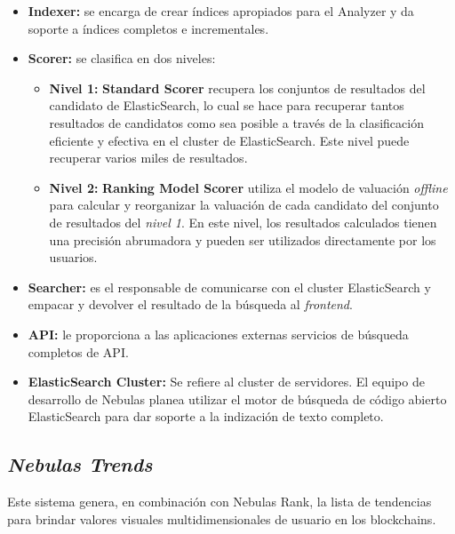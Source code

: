 \begin{itemize}
	\item \textbf{Indexer:} se encarga de crear índices apropiados para el Analyzer y da soporte a índices completos e incrementales.

	\item \textbf{Scorer:} se clasifica en dos niveles:
	\begin{itemize}
		\item \textbf{Nivel 1:} \textbf{Standard Scorer} recupera los conjuntos de resultados del candidato de ElasticSearch, lo cual se hace para recuperar tantos resultados de candidatos como sea posible a través de la clasificación eficiente y efectiva en el cluster de ElasticSearch. Este nivel puede recuperar varios miles de resultados.
		\item \textbf{Nivel 2:} \textbf{Ranking Model Scorer} utiliza el modelo de valuación \textit{offline} para calcular y reorganizar la valuación de cada candidato del conjunto de resultados del \textit{nivel 1}. En este nivel, los resultados calculados tienen una precisión abrumadora y pueden ser utilizados directamente por los usuarios.
	\end{itemize}
	\item \textbf{Searcher:} es el responsable de comunicarse con el cluster ElasticSearch y empacar y devolver el resultado de la búsqueda al \textit{frontend}.

	\item \textbf{API:} le proporciona a las aplicaciones externas servicios de búsqueda completos de API.

	\item \textbf{ElasticSearch Cluster:} Se refiere al cluster de servidores. El equipo de desarrollo de Nebulas planea utilizar el motor de búsqueda de código abierto ElasticSearch para dar soporte a la indización de texto completo.

\end{itemize}

\subsection{\textit{Nebulas Trends}}

Este sistema genera, en combinación con Nebulas Rank, la lista de tendencias para brindar valores visuales multidimensionales de usuario en los blockchains.

